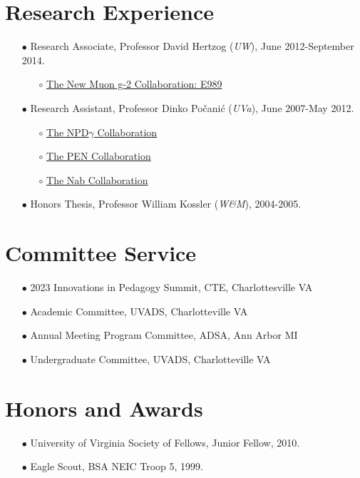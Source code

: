 \documentclass{article}[10pt]
\begin{document}
\section*{Research Experience}
\begin{itemize}
\item [$\bullet$] Research Associate, Professor David Hertzog (\emph{UW}), June 2012-September 2014.
\begin{itemize}
\item [$\circ$] \href{http://muon-g-2.fnal.gov/collaboration.shtml}{The New Muon g-2 Collaboration: E989}
\end{itemize}
\item [$\bullet$] Research Assistant, Professor Dinko Po\v{c}ani\'c (\emph{UVa}), June 2007-May 2012.
\begin{itemize}
\item [$\circ$] \href{https://en.wikipedia.org/wiki/NPDGamma_experiment}{The NPD$\gamma$ Collaboration}
\item [$\circ$] \href{http://pen.phys.virginia.edu/}{The PEN Collaboration}
\item [$\circ$] \href{http://nab.phys.virginia.edu/}{The Nab Collaboration}
\end{itemize}
\item [$\bullet$] Honors Thesis, Professor William Kossler (\emph{W\&M}), 2004-2005.
\end{itemize}






\section*{Committee Service}
\begin{itemize}
\item [$\bullet$] 2023 Innovations in Pedagogy Summit, CTE, Charlottesville VA
\item [$\bullet$] Academic Committee, UVADS, Charlotteville VA
\item [$\bullet$] Annual Meeting Program Committee, ADSA, Ann Arbor MI
\item [$\bullet$] Undergraduate Committee, UVADS, Charlotteville VA
\end{itemize}




\section*{Honors and Awards}
\begin{itemize}
\item [$\bullet$] University of Virginia Society of Fellows, Junior Fellow, 2010.
\item [$\bullet$] Eagle Scout, BSA NEIC Troop 5, 1999.
\end{itemize}
\end{document}
